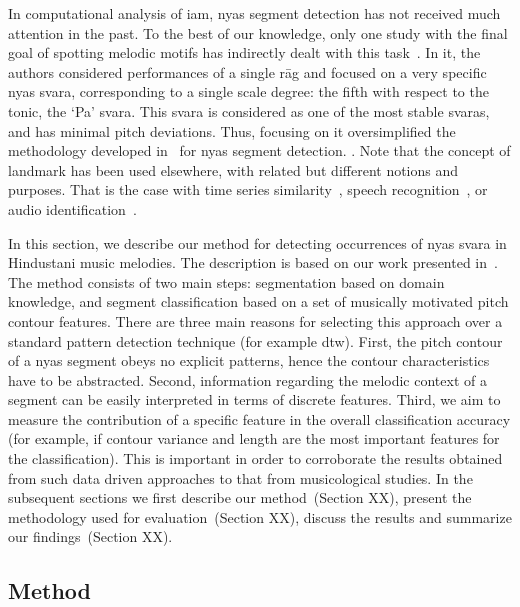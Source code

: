 {In computational analysis of \gls{iam}, \gls{nyas} segment detection has not received much attention in the past. To the best of our knowledge, only one study with the final goal of spotting melodic motifs has indirectly dealt with this task~\citep{Ross2012}. In it, the authors considered performances of a single r\={a}g and focused on a very specific \gls{nyas} \gls{svara}, corresponding to a single scale degree: the fifth with respect to the tonic, the `Pa' \gls{svara}. This \gls{svara} is considered as one of the most stable \glspl{svara}, and has minimal pitch deviations. Thus, focusing on it oversimplified the methodology developed in~\cite{Ross2012} for \gls{nyas} segment detection. . Note that the concept of landmark has been used elsewhere, with related but different notions and purposes. That is the case with time series similarity~\citep{Perng00ICDE}, speech recognition~\citep{Jansen08JASA,Chen12ICASSP}, or audio identification~\citep{Duong13ICASSP}.

In this section, we describe our method for detecting occurrences of \gls{nyas} \gls{svara} in Hindustani music melodies. The description is based on our work presented in~\cite{gulati2014Landmark}. The method consists of two main steps: segmentation based on domain knowledge, and segment classification based on a set of musically motivated pitch contour features. There are three main reasons for selecting this approach over a standard pattern detection technique (for example \gls{dtw}). First, the pitch contour of a \gls{nyas} segment obeys no explicit patterns, hence the contour characteristics have to be abstracted. Second, information regarding the melodic context of a segment can be easily interpreted in terms of discrete features. Third, we aim to measure the contribution of a specific feature in the overall classification accuracy (for example, if contour variance and length are the most important features for the classification). This is important in order to corroborate the results obtained from such data driven approaches to that from musicological studies. In the subsequent sections we first describe our method~(Section XX), present the methodology used for evaluation~(Section XX), discuss the results and summarize our findings~(Section XX).

\subsection{Method}
\label{sec:pre_processing_nyas_id_method}

}
